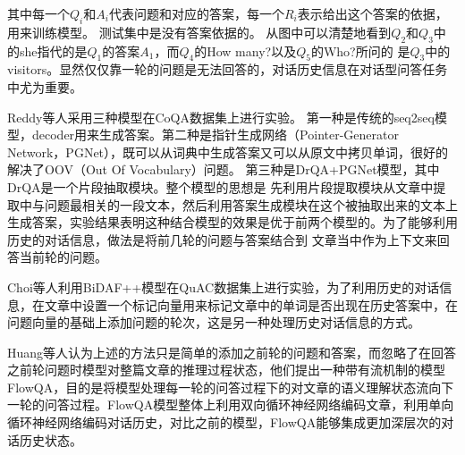 其中每一个$Q_i$和$A_i$代表问题和对应的答案，每一个$R_i$表示给出这个答案的依据，用来训练模型。
测试集中是没有答案依据的。
从图中可以清楚地看到$Q_2$和$Q_3$中的she指代的是$Q_1$的答案$A_1$，而$Q_4$的How many?以及$Q_5$的Who?所问的
是$Q_3$中的visitors。显然仅仅靠一轮的问题是无法回答的，对话历史信息在对话型问答任务中尤为重要。

Reddy等人采用三种模型在CoQA数据集上进行实验。
第一种是传统的seq2seq模型，decoder用来生成答案。第二种是指针生成网络（Pointer-Generator Network，PGNet），既可以从词典中生成答案又可以从原文中拷贝单词，很好的解决了OOV（Out Of Vocabulary）问题。
第三种是DrQA+PGNet模型，其中DrQA是一个片段抽取模块。整个模型的思想是
先利用片段提取模块从文章中提取中与问题最相关的一段文本，然后利用答案生成模块在这个被抽取出来的文本上
生成答案，实验结果表明这种结合模型的效果是优于前两个模型的。为了能够利用历史的对话信息，做法是将前几轮的问题与答案结合到
文章当中作为上下文来回答当前轮的问题。

Choi等人利用BiDAF++模型在QuAC数据集上进行实验，为了利用历史的对话信息，在文章中设置一个标记向量用来标记文章中的单词是否出现在历史答案中，在问题向量的基础上添加问题的轮次，这是另一种处理历史对话信息的方式。

Huang等人认为上述的方法只是简单的添加之前轮的问题和答案，而忽略了在回答之前轮问题时模型对整篇文章的推理过程状态，他们提出一种带有流机制的模型FlowQA，目的是将模型处理每一轮的问答过程下的对文章的语义理解状态流向下一轮的问答过程。FlowQA模型整体上利用双向循环神经网络编码文章，利用单向循环神经网络编码对话历史，对比之前的模型，FlowQA能够集成更加深层次的对话历史状态。

